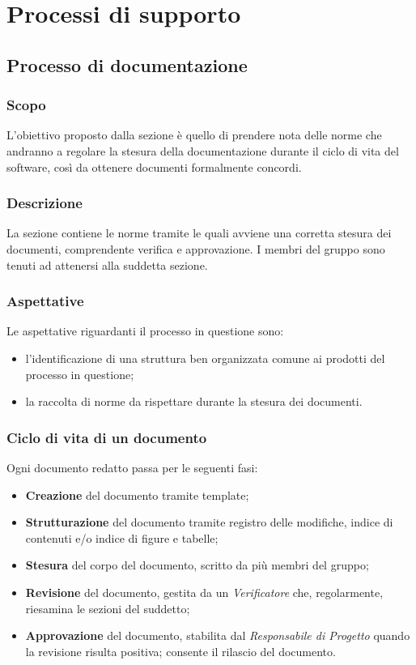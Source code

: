 \section{Processi di supporto}


\subsection{Processo di documentazione}

\subsubsection{Scopo}

L'obiettivo proposto dalla sezione è quello di prendere nota delle norme che andranno a regolare la stesura della documentazione durante il ciclo di vita del software,  così da ottenere documenti formalmente concordi.

\subsubsection{Descrizione}

La sezione contiene le norme tramite le quali avviene una corretta stesura dei documenti,  comprendente verifica e approvazione.  I membri del gruppo sono tenuti ad attenersi alla suddetta sezione.

\subsubsection{Aspettative}

Le aspettative riguardanti il processo in questione sono:
\begin{itemize}
	\item l'identificazione di una struttura ben organizzata comune ai prodotti del processo in questione;
	\item la raccolta di norme da rispettare durante la stesura dei documenti.
\end{itemize}

\subsubsection{Ciclo di vita di un documento}

Ogni documento redatto passa per le seguenti fasi:
\begin{itemize}
	\item \textbf{Creazione} del documento tramite template;
	\item \textbf{Strutturazione} del documento tramite registro delle modifiche,  indice di contenuti e/o indice di figure e tabelle;
	\item \textbf{Stesura} del corpo del documento,  scritto da più membri del gruppo;
	\item \textbf{Revisione} del documento, gestita da un \textit{Verificatore} che,  regolarmente,  riesamina le sezioni del suddetto;
	\item \textbf{Approvazione} del documento, stabilita dal \textit{Responsabile di Progetto} quando la revisione risulta positiva; consente il rilascio del documento.
\end{itemize}

